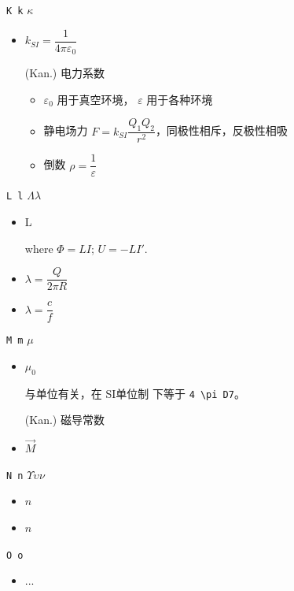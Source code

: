 \texttt{K k} $\kappa$\begin{itemize}

\item $k_{SI} = \dfrac {1}{4 \pi \varepsilon_0}$

(Kan.) 电力系数\begin{itemize}

\item $\varepsilon_0$ 用于真空环境， $\varepsilon$ 用于各种环境

\item 静电场力 $F = k_{SI} \dfrac{Q_1 Q_2}{r^2}$，同极性相斥，反极性相吸

\item 倒数 $\rho = \dfrac 1 \varepsilon$

\end{itemize}



\end{itemize}

\texttt{L l} $\Lambda \lambda$\begin{itemize}

\item L 

where $\Phi=LI$; $U = -LI'$.

\item $\lambda = \dfrac Q {2 \pi R}$

\item $\lambda = \dfrac{c}{f}$

\end{itemize}

\texttt{M m} $\mu$\begin{itemize}

\item $\mu_0$

与单位有关，在 SI单位制 下等于 \verb|4 \pi D7|。

(Kan.) 磁导常数 

\item $\vec{M}$

\end{itemize}

\texttt{N n} $\Upsilon \upsilon \nu$\begin{itemize}

\item $n$

\item $\hat{n}$

\end{itemize}

\texttt{O o} \begin{itemize}

\item ...

\end{itemize}

